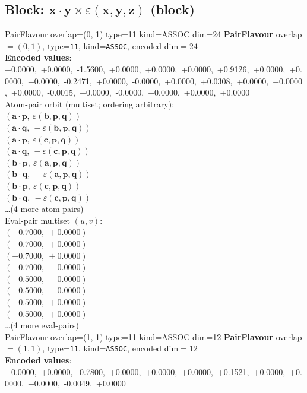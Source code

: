 \documentclass[a4paper,11pt]{article}
\newcommand{\pdcegfomjfhook}[2]{\mathbf{#1} \cdot \mathbf{#2}}
\newcommand{\kblbmcpggoncpf}[3]{\varepsilon(\mathbf{#1},\mathbf{#2},\mathbf{#3})}
\begin{document}
\subsection{Block: $\pdcegfomjfhook{x}{y} \times \kblbmcpggoncpf{x}{y}{z}$  (block)}
    PairFlavour  overlap=(0, 1)  type=11  kind=ASSOC  dim=24
\textbf{PairFlavour} overlap$=(0, 1)$, type=\texttt{11}, kind=\texttt{ASSOC}, encoded dim$=24$\\
\textbf{      Encoded values}: +0.0000,\ +0.0000,\ -1.5600,\ +0.0000,\ +0.0000,\ +0.0000,\ +0.9126,\ +0.0000,\ +0.0000,\ +0.0000,\ -0.2471,\ +0.0000,\ -0.0000,\ +0.0000,\ +0.0308,\ +0.0000,\ +0.0000,\ +0.0000,\ -0.0015,\ +0.0000,\ -0.0000,\ +0.0000,\ +0.0000,\ +0.0000\\
\quad Atom-pair orbit (multiset; ordering arbitrary):\\
$(\pdcegfomjfhook{a}{p},\ \kblbmcpggoncpf{b}{p}{q})$\\
$(\pdcegfomjfhook{a}{q},\ -\kblbmcpggoncpf{b}{p}{q})$\\
$(\pdcegfomjfhook{a}{p},\ \kblbmcpggoncpf{c}{p}{q})$\\
$(\pdcegfomjfhook{a}{q},\ -\kblbmcpggoncpf{c}{p}{q})$\\
$(\pdcegfomjfhook{b}{p},\ \kblbmcpggoncpf{a}{p}{q})$\\
$(\pdcegfomjfhook{b}{q},\ -\kblbmcpggoncpf{a}{p}{q})$\\
$(\pdcegfomjfhook{b}{p},\ \kblbmcpggoncpf{c}{p}{q})$\\
$(\pdcegfomjfhook{b}{q},\ -\kblbmcpggoncpf{c}{p}{q})$\\
\quad \ldots (4 more atom-pairs)\\
\quad Eval-pair multiset $(u, v)$:\\
$(+0.7000,\ +0.0000)$\\
$(+0.7000,\ +0.0000)$\\
$(-0.7000,\ +0.0000)$\\
$(-0.7000,\ -0.0000)$\\
$(-0.5000,\ -0.0000)$\\
$(-0.5000,\ -0.0000)$\\
$(+0.5000,\ +0.0000)$\\
$(+0.5000,\ +0.0000)$\\
\quad \ldots (4 more eval-pairs)\\
    PairFlavour  overlap=(1, 1)  type=11  kind=ASSOC  dim=12
\textbf{PairFlavour} overlap$=(1, 1)$, type=\texttt{11}, kind=\texttt{ASSOC}, encoded dim$=12$\\
\textbf{      Encoded values}: +0.0000,\ +0.0000,\ -0.7800,\ +0.0000,\ +0.0000,\ +0.0000,\ +0.1521,\ +0.0000,\ +0.0000,\ +0.0000,\ -0.0049,\ +0.0000\\
\end{document}
